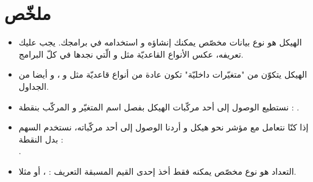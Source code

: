 \section*{ملخّص}

\begin{itemize}
  \item الهيكل هو نوع بيانات مخصّص يمكنك إنشاؤه و استخدامه في برامجك. يجب عليك تعريفه، عكس الأنواع القاعديّة مثل
و
الّتي نجدها في كلّ البرامج.
  \item الهيكل يتكوّن من "متغيّرات داخليّة" تكون عادة من أنواع قاعديّة مثل
و
،
و أيضا من الجداول.
  \item نستطيع الوصول إلى أحد مركّبات الهيكل بفصل اسم المتغيّر و المركّب بنقطة :
.
  \item إذا كنّا نتعامل مع مؤشر نحو هيكل و أردنا الوصول إلى أحد مركّباته، نستخدم السهم بدل النقطة :\\
.
  \item التعداد هو نوع مخصّص يمكنه فقط أخذ إحدى القيم المسبقة التعريف :
،
أو
مثلا.
\end{itemize}
